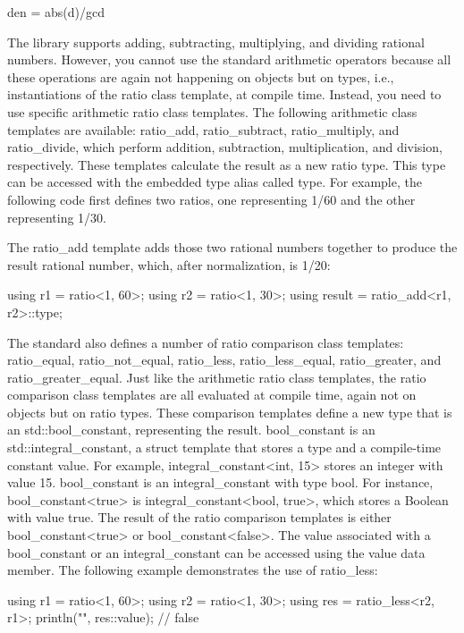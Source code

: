 \begin{cpp}
den = abs(d)/gcd
\end{cpp}

The library supports adding, subtracting, multiplying, and dividing rational numbers. However, you cannot use the standard arithmetic operators because all these operations are again not happening on objects but on types, i.e., instantiations of the ratio class template, at compile time. Instead, you need to use specific arithmetic ratio class templates. The following arithmetic class templates are available: ratio\_add, ratio\_subtract, ratio\_multiply, and ratio\_divide, which perform addition, subtraction, multiplication, and division, respectively. These templates calculate the result as a new ratio type. This type can be accessed with the embedded type alias called type. For example, the following code first defines two ratios, one representing 1/60 and the other representing 1/30.

The ratio\_add template adds those two rational numbers together to produce the result rational number, which, after normalization, is 1/20:

\begin{cpp}
using r1 = ratio<1, 60>;
using r2 = ratio<1, 30>;
using result = ratio_add<r1, r2>::type;
\end{cpp}

The standard also defines a number of ratio comparison class templates: ratio\_equal, ratio\_not\_equal, ratio\_less, ratio\_less\_equal, ratio\_greater, and ratio\_greater\_equal. Just like the arithmetic ratio class templates, the ratio comparison class templates are all evaluated at compile time, again not on objects but on ratio types. These comparison templates define a new type that is an std::bool\_constant, representing the result. bool\_constant is an std::integral\_constant, a struct template that stores a type and a compile-time constant value. For example, integral\_constant<int, 15> stores an integer with value 15. bool\_constant is an integral\_constant with type bool. For instance, bool\_constant<true> is integral\_constant<bool, true>, which stores a Boolean with value true. The result of the ratio comparison templates is either bool\_constant<true> or bool\_constant<false>. The value associated with a bool\_constant or an integral\_constant can be accessed using the value data member. The following example demonstrates the use of ratio\_less:

\begin{cpp}
using r1 = ratio<1, 60>;
using r2 = ratio<1, 30>;
using res = ratio_less<r2, r1>;
println("{}", res::value); // false
\end{cpp}

